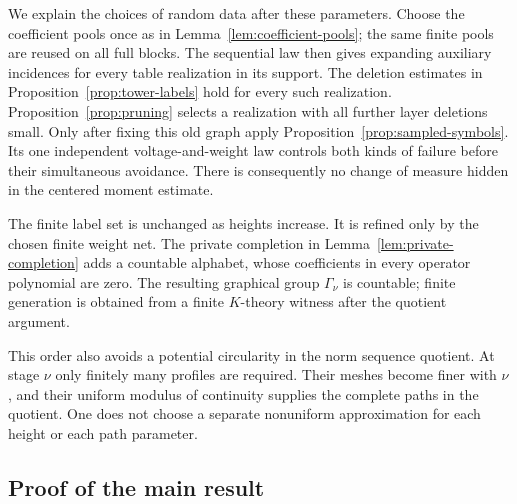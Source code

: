 We explain the choices of random data after these parameters.
Choose the coefficient pools once as in
Lemma~\ref{lem:coefficient-pools}; the same finite pools are reused
on all full blocks.  The sequential law then gives expanding
auxiliary incidences for every table realization in its support.
The deletion estimates in Proposition~\ref{prop:tower-labels}
hold for every such realization.  Proposition~\ref{prop:pruning}
selects a realization with all further layer deletions small.
Only after fixing this old graph apply
Proposition~\ref{prop:sampled-symbols}.  Its one independent
voltage-and-weight law controls both kinds of failure before
their simultaneous avoidance.  There is consequently no change
of measure hidden in the centered moment estimate.

The finite label set is unchanged as heights increase.  It is
refined only by the chosen finite weight net.  The private
completion in Lemma~\ref{lem:private-completion} adds a countable
alphabet, whose coefficients in every operator polynomial are
zero.  The resulting graphical group $\Gamma_\nu$ is countable;
finite generation is obtained from a finite $K$-theory witness
after the quotient argument.

This order also avoids a potential circularity in the norm
sequence quotient.  At stage $\nu$ only finitely many profiles
are required.  Their meshes become finer with $\nu$, and their
uniform modulus of continuity supplies the complete paths in
the quotient.  One does not choose a separate nonuniform
approximation for each height or each path parameter.

\subsection{Proof of the main result}

